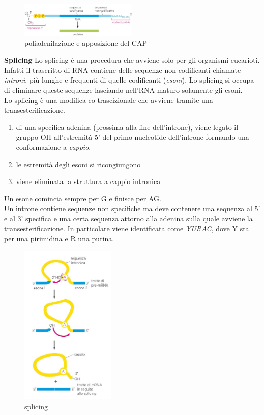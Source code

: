             \begin{figure}[h]
                \centering
                \includegraphics[width=0.5\textwidth]{images/poliAeCap.JPG}
                \caption{\small poliadenilazione e apposizione del CAP}
                \label{fig:mesh1}
            \end{figure}
            
            \textbf{Splicing}
            Lo splicing è una procedura che avviene solo per gli organismi eucarioti. Infatti il trascritto di RNA contiene delle sequenze non codificanti chiamate \textit{introni}, più lunghe e frequenti di quelle codificanti (\textit{esoni}). 
            Lo splicing si occupa di eliminare queste sequenze lasciando nell'RNA maturo solamente gli esoni.\\
            Lo splicing è una modifica co-trascizionale che avviene tramite una transesterificazione.
            \begin{enumerate}
                \item di una specifica adenina (prossima alla fine dell'introne), viene legato il gruppo OH all'estremità 5' del primo nucleotide dell'introne formando una conformazione a \textit{cappio}.
                \item le estremità degli esoni si ricongiungono
                \item viene eliminata la struttura a cappio intronica
            \end{enumerate}
            Un esone comincia sempre per G e finisce per AG.\\
            Un introne contiene sequenze non specifiche ma deve contenere una sequenza al 5' e al 3' specifica e una certa sequenza attorno alla adenina sulla quale avviene la transesterificazione. In particolare viene identificata come \textit{YURAC}, dove Y sta per una pirimidina e R una purina.
            \begin{figure}[h]
                \centering
                \includegraphics[width=0.4\textwidth]{images/splicing.JPG}
                \caption{\small splicing}
                \label{fig:mesh1}
            \end{figure}
